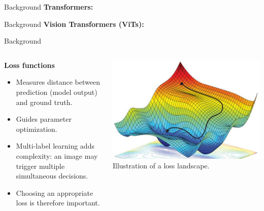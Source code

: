 
\begin{frame}{Background}
  \textbf{Transformers:}
\end{frame}


\begin{frame}{Background}
  \textbf{Vision Transformers (ViTs):}
\end{frame}

\begin{frame}{Background}
  \begin{columns}
    \begin{column}{0.55\textwidth}
      \textbf{Loss functions}
      \begin{itemize}
        \item Measures distance between prediction (model output) and ground truth.
        \item Guides parameter optimization.
        \item Multi-label learning adds complexity: an image may trigger multiple simultaneous decisions.
        \item Choosing an appropriate loss is therefore important.
      \end{itemize}
    \end{column}

    \begin{column}{0.45\textwidth}
      \centering
      \includegraphics[width=0.9\linewidth]{Images/loss_optimization.png}\\
      \scriptsize Illustration of a loss landscape.
    \end{column}
  \end{columns}
\end{frame}


